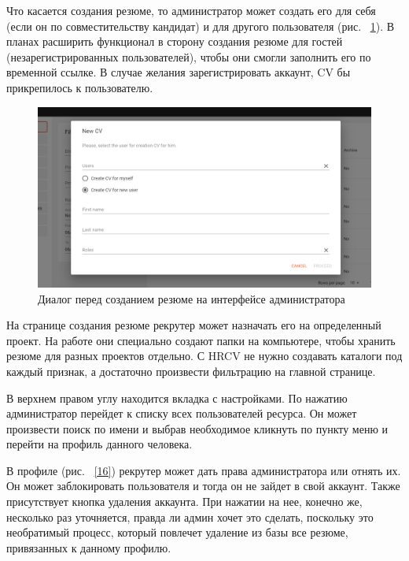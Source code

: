 \documentclass[14pt, a4paper]{diplom}
\begin{document}
Что касается создания резюме, то администратор может создать его для себя (если он по совместительству кандидат) и для другого пользователя (рис. ~\ref{15}). В планах расширить функционал в сторону создания резюме для гостей (незарегистрированных пользователей), чтобы
они смогли заполнить его по временной ссылке. В случае желания зарегистрировать аккаунт, CV бы прикрепилось к пользователю.

\begin{figure}[!ht]
\centering
\includegraphics[width=1\textwidth]{resources/newcvdialog.png}
\caption{Диалог перед созданием резюме на интерфейсе администратора}
\label{15}
\end{figure}

На странице создания резюме рекрутер может назначать его на определенный проект. На работе они специально создают папки на компьютере, чтобы хранить резюме для разных проектов отдельно. С HRCV не нужно создавать каталоги под каждый признак, а достаточно произвести фильтрацию на главной странице.

В верхнем правом углу находится вкладка с настройками. По нажатию администратор перейдет к списку всех пользователей ресурса. Он может произвести поиск по имени и выбрав необходимое кликнуть по пункту меню и перейти на профиль данного человека.

В профиле (рис. ~\ref{16}) рекрутер может дать права администратора или отнять их. Он может заблокировать пользователя и тогда он не зайдет в свой аккаунт.
Также присутствует кнопка удаления аккаунта. При нажатии на нее, конечно же, несколько раз уточняется, правда ли админ хочет это сделать, поскольку это необратимый процесс, который повлечет удаление из базы все резюме, привязанных к данному профилю.
\end{document}
